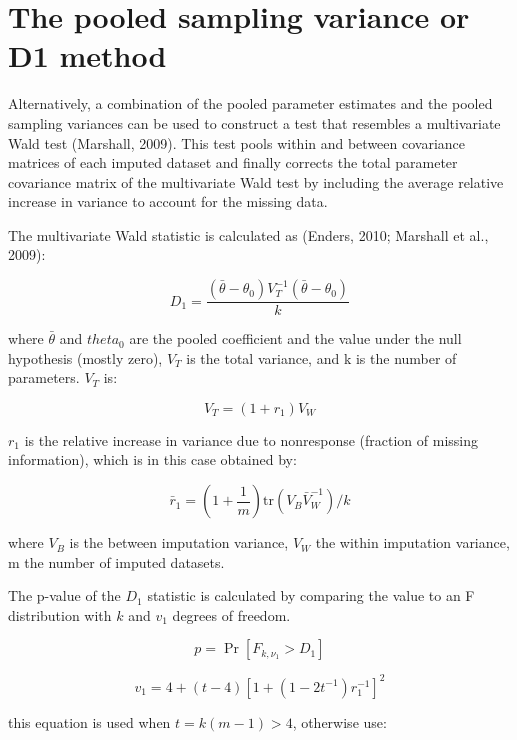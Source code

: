\documentclass[
]{book}
\begin{document}
\hypertarget{the-pooled-sampling-variance-or-d1-method}{%
\section{The pooled sampling variance or D1 method}\label{the-pooled-sampling-variance-or-d1-method}}

Alternatively, a combination of the pooled parameter estimates and the pooled sampling variances can be used to construct a test that resembles a multivariate Wald test (Marshall, 2009). This test pools within and between covariance matrices of each imputed dataset and finally corrects the total parameter covariance matrix of the multivariate Wald test by including the average relative increase in variance to account for the missing data.

The multivariate Wald statistic is calculated as (Enders, 2010; Marshall et al., 2009):

\begin{equation}
  D_1 = \frac{ (\bar\theta - \theta_0)V_T^{-1} (\bar\theta - \theta_0) } {k}
  \label{eq:d1}
\end{equation}

where \(\bar\theta\) and \(theta_0\) are the pooled coefficient and the value under the null hypothesis (mostly zero), \(V_T\) is the total variance, and k is the number of parameters. \(V_T\) is:

\[V_T = (1+r_{1})V_W\]

\(r_1\) is the relative increase in variance due to nonresponse (fraction of missing information), which is in this case obtained by:

\begin{equation}
\bar r_1 = \left(1+\frac{1}{m}\right)\mathrm{tr}(V_B\bar V_W^{-1})/k
\label{eq:r1}
\end{equation}

where \(V_B\) is the between imputation variance, \(V_W\) the within imputation variance, m the number of imputed datasets.

The p-value of the \(D_1\) statistic is calculated by comparing the value to an F distribution with \(k\) and \(v_1\) degrees of freedom.

\[p = \Pr[F_{k,\nu_1}>D_1]\]

\begin{equation}
v_1 = 4 + (t-4)[1+(1-2t^{-1})r_1^{-1}]^2
\label{eq:v1a}
\end{equation}

this equation is used when \(t = k(m-1) > 4\), otherwise use:
\end{document}
